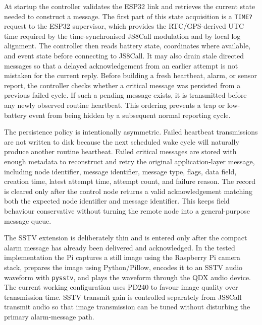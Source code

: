 \documentclass[acmsmall,screen]{acmart}
\begin{document}
At startup the controller validates the ESP32 link and retrieves the current state needed to construct a message. The first part of this state acquisition is a \texttt{TIME?} request to the ESP32 supervisor, which provides the RTC/GPS-derived UTC time required by the time-synchronised JS8Call modulation and by local log alignment. The controller then reads battery state, coordinates where available, and event state before connecting to JS8Call. It may also drain stale directed messages so that a delayed acknowledgement from an earlier attempt is not mistaken for the current reply. Before building a fresh heartbeat, alarm, or sensor report, the controller checks whether a critical message was persisted from a previous failed cycle. If such a pending message exists, it is transmitted before any newly observed routine heartbeat. This ordering prevents a trap or low-battery event from being hidden by a subsequent normal reporting cycle.

The persistence policy is intentionally asymmetric. Failed heartbeat transmissions are not written to disk because the next scheduled wake cycle will naturally produce another routine heartbeat. Failed critical messages are stored with enough metadata to reconstruct and retry the original application-layer message, including node identifier, message identifier, message type, flags, data field, creation time, latest attempt time, attempt count, and failure reason. The record is cleared only after the control node returns a valid acknowledgement matching both the expected node identifier and message identifier. This keeps field behaviour conservative without turning the remote node into a general-purpose message queue.

The SSTV extension is deliberately thin and is entered only after the compact alarm message has already been delivered and acknowledged. In the tested implementation the Pi captures a still image using the Raspberry Pi camera stack, prepares the image using Python/Pillow, encodes it to an SSTV audio waveform with \texttt{pysstv}, and plays the waveform through the QDX audio device. The current working configuration uses PD240 to favour image quality over transmission time. SSTV transmit gain is controlled separately from JS8Call transmit audio so that image transmission can be tuned without disturbing the primary alarm-message path.
\end{document}

